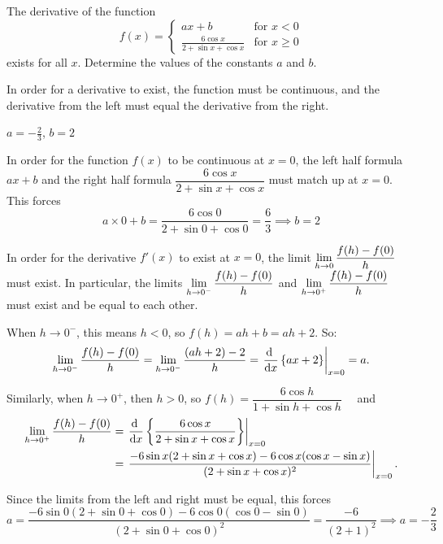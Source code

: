 \begin{question}[1997A]
 The derivative of the function
\[
f(x)=\left\{\begin{array}{ll}
ax+b& \mbox{for }x<0\\
            \frac{6\cos x}{2+\sin x+\cos x}& \mbox{for }x\ge 0
\end{array}\right.
\]
exists for all $x$. Determine the values of the constants $a$ and $b$.
\end{question}
\begin{hint} In order for a derivative to exist, the function must be continuous, and the derivative from the left must equal the derivative from the right.
\end{hint}
\begin{answer} $a=-\frac{2}{3}$, $b=2$
\end{answer}
\begin{solution}  In order for the function $f(x)$ to be continuous at $x=0$,
the left half formula $ax+b$ and the right half formula
$\dfrac{6\cos x}{2+\sin x+\cos x}$ must match up at $x=0$. This
forces
$$
a\times 0+b=\frac{6\cos 0}{2+\sin 0+\cos 0}=\frac{6}{3}
\implies \boxed{b=2}
$$

In order for the derivative $f'(x)$ to exist at $x=0$,
the limit $\displaystyle\lim_{h \rightarrow 0} \dfrac{f(h)-f(0)}{h}$ must exist. In particular,
the limits $\displaystyle\lim_{h \rightarrow 0^-} \dfrac{f(h)-f(0)}{h}$
and
$\displaystyle\lim_{h \rightarrow 0^+} \dfrac{f(h)-f(0)}{h}$ must exist and be equal to each other.

When $h \to 0^-$, this means $h<0$, so $f(h)=ah+b=ah+2$. So:
\[\ds\lim_{h\to 0^-}\dfrac{f(h)-f(0)}{h}=\ds\lim_{h\to 0^-}\dfrac{(ah+2)-2}{h}=\left.\ds\diff{}{x}\left\{ax+2\right\}\right|_{x=0}=a.\]

Similarly, when $h \to 0^+$, then $h>0$, so $f(h)=\dfrac{6\cos h}{1+\sin h + \cos h}$ ~~and \begin{align*}
\ds\lim_{h \rightarrow 0^+} \dfrac{f(h)-f(0)}{h} &= \left.\ds\diff{}{x}\left\{\dfrac{6\cos x}{2+\sin x + \cos x}\right\}\right|_{x=0}
\\&=\left.\frac{-6\sin x(2+\sin x+\cos x)-6\cos x(\cos x-\sin x)}{(2+\sin x+\cos x)^2}\right|_{x=0}.\end{align*}

Since the limits from the left and right must be equal, this forces
$$
a=\frac{-6\sin 0(2+\sin 0+\cos 0)-6\cos 0(\cos 0-\sin 0)}{(2+\sin 0+\cos 0)^2}
=\frac{-6}{(2+1)^2}\implies\boxed{a=-\frac{2}{3}}
$$
\end{solution}


